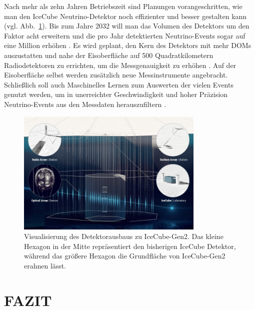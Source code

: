 \documentclass[a4paper,12pt]{article}
\newcommand{\figref}[1]{Abb.~\ref{#1}}
\begin{document}
Nach mehr als zehn Jahren Betriebszeit sind Planungen vorangeschritten, wie man den IceCube Neutrino-Detektor noch effizienter und besser gestalten kann (vgl. \figref{fig:detektorausbau}). Bis zum Jahre 2032 will man das Volumen des Detektors um den Faktor acht erweitern und die pro Jahr detektierten Neutrino-Events sogar auf eine Million erhöhen \cite{DESD}. Es wird geplant, den Kern des Detektors mit mehr DOMs auszustatten und nahe der Eisoberfläche auf 500 Quadratkilometern Radiodetektoren zu errichten, um die Messgenauigkeit zu erhöhen \cite{DESD}. Auf der Eisoberfläche selbst werden zusätzlich neue Messinstrumente angebracht. Schließlich soll auch Maschinelles Lernen zum Auswerten der vielen Events genutzt werden, um in unerreichter Geschwindigkeit und hoher Präzision Neutrino-Events aus den Messdaten herauszufiltern \cite{DESD}.
\begin{figure}[H]
\centering
\includegraphics[width=0.8\textwidth]{Detektorausbau}
\caption[Visualisierung des Detektorausbaus zu IceCube-Gen2. Das kleine Hexagon in der Mitte repräsentiert den bisherigen IceCube Detektor, während das größere Hexagon die Grundfläche von IceCube-Gen2 erahnen lässt. \copyright DESY, Science Communication Lab. -- Quelle: {\cite{DESD}}]{Visualisierung des Detektorausbaus zu IceCube-Gen2. Das kleine Hexagon in der Mitte repräsentiert den bisherigen IceCube Detektor, während das größere Hexagon die Grundfläche von IceCube-Gen2 erahnen lässt.}
\label{fig:detektorausbau}
\end{figure}


\section{FAZIT} \label{sec:4}
\end{document}
